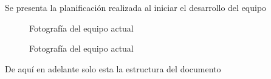 Se presenta la planificación realizada al iniciar el desarrollo del equipo

\begin{figure}[ht]
	\centering
	\caption{Fotografía del equipo actual}
	\label{fig:DiagramaAON}
\end{figure}

\begin{figure}[ht]
	\centering
	\caption{Fotografía del equipo actual}
	\label{fig:DiagramaGantt}
\end{figure}


\begin{center}
	{\Large\color{red} De aquí en adelante solo esta la estructura del documento}
\end{center}
